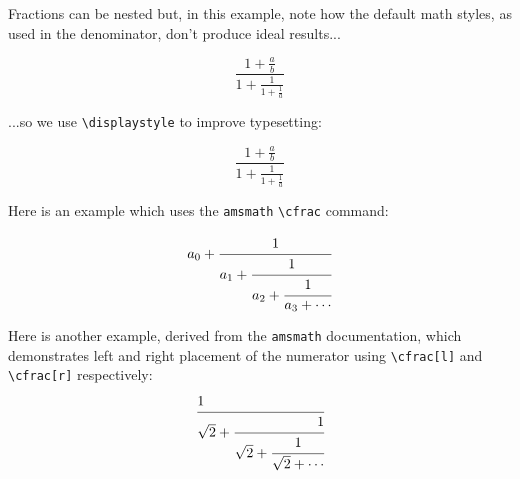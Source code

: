 \documentclass{article}
\theoremstyle{definition}
\theoremstyle{remark}
\begin{document}
Fractions can be nested but, in this example, note how the default math styles, as used in the denominator, don't produce ideal results...

\[ \frac{1+\frac{a}{b}}{1+\frac{1}{1+\frac{1}{a}}} \]

\noindent ...so we use \verb|\displaystyle| to improve typesetting:

\[ \frac{1+\frac{a}{b}} {\displaystyle 1+\frac{1}{1+\frac{1}{a}}} \]

Here is an example which uses the \texttt{amsmath} \verb|\cfrac| command:

\[
  a_0+\cfrac{1}{a_1+\cfrac{1}{a_2+\cfrac{1}{a_3+\cdots}}}
\]

Here is another example, derived from the \texttt{amsmath} documentation, which demonstrates left
and right placement of the numerator using \verb|\cfrac[l]| and \verb|\cfrac[r]| respectively:
\[
\cfrac[l]{1}{\sqrt{2}+
\cfrac[r]{1}{\sqrt{2}+
\cfrac{1}{\sqrt{2}+\dotsb}}}
\]







\end{document}
